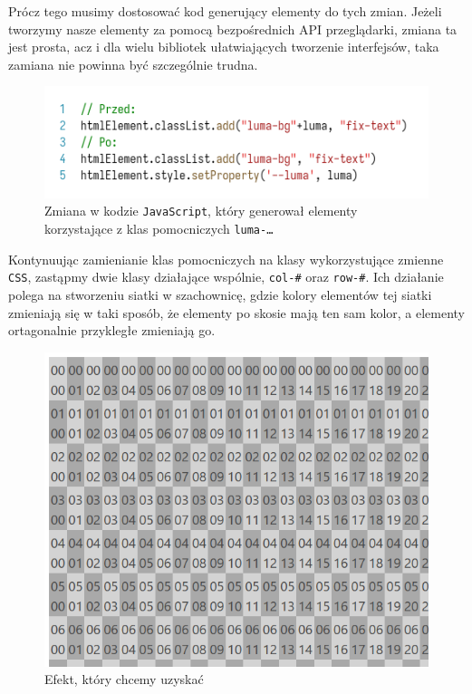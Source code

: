 \documentclass[licencjacka]{pracadypl}
\begin{document}
Prócz tego musimy dostosować kod generujący elementy do tych zmian. Jeżeli tworzymy nasze elementy za pomocą bezpośrednich API przeglądarki, zmiana ta jest prosta, acz i dla wielu bibliotek ułatwiających tworzenie interfejsów, taka zamiana nie powinna być szczególnie trudna.

\begin{figure}[H]
  \centering
  \includegraphics[width=\linewidth]{images/code-js-luma-adjust.png}
  \caption{Zmiana w kodzie \texttt{JavaScript}, który generował elementy korzystające z klas pomocniczych \texttt{luma-\dots}}
  \label{fig:code-js-luma-adjust}
\end{figure}

Kontynuując zamienianie klas pomocniczych na klasy wykorzystujące zmienne \texttt{CSS}, zastąpmy dwie klasy działające wspólnie, \texttt{col-\#} oraz \texttt{row-\#}. Ich działanie polega na stworzeniu siatki w szachownicę, gdzie kolory elementów tej siatki zmieniają się w taki sposób, że elementy po skosie mają ten sam kolor, a elementy ortagonalnie przykległe zmieniają go.

\begin{figure}[H]
  \centering
  \includegraphics[width=\linewidth/\real{1.2}]{images/ui-grid-darken.png}
  \caption{Efekt, który chcemy uzyskać}
  \label{fig:ui-grid-darken}
\end{figure}
\end{document}
